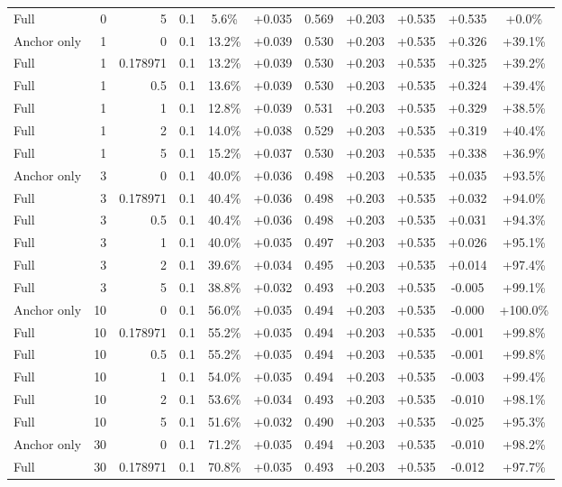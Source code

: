 \begin{table}[htbp]
\begin{tabular}{lrrrccccccc}
Full & 0 & 5 & 0.1 & 5.6\% & +0.035 & 0.569 & +0.203 & +0.535 & +0.535 & +0.0\% \\
Anchor only & 1 & 0 & 0.1 & 13.2\% & +0.039 & 0.530 & +0.203 & +0.535 & +0.326 & +39.1\% \\
Full & 1 & 0.178971 & 0.1 & 13.2\% & +0.039 & 0.530 & +0.203 & +0.535 & +0.325 & +39.2\% \\
Full & 1 & 0.5 & 0.1 & 13.6\% & +0.039 & 0.530 & +0.203 & +0.535 & +0.324 & +39.4\% \\
Full & 1 & 1 & 0.1 & 12.8\% & +0.039 & 0.531 & +0.203 & +0.535 & +0.329 & +38.5\% \\
Full & 1 & 2 & 0.1 & 14.0\% & +0.038 & 0.529 & +0.203 & +0.535 & +0.319 & +40.4\% \\
Full & 1 & 5 & 0.1 & 15.2\% & +0.037 & 0.530 & +0.203 & +0.535 & +0.338 & +36.9\% \\
Anchor only & 3 & 0 & 0.1 & 40.0\% & +0.036 & 0.498 & +0.203 & +0.535 & +0.035 & +93.5\% \\
Full & 3 & 0.178971 & 0.1 & 40.4\% & +0.036 & 0.498 & +0.203 & +0.535 & +0.032 & +94.0\% \\
Full & 3 & 0.5 & 0.1 & 40.4\% & +0.036 & 0.498 & +0.203 & +0.535 & +0.031 & +94.3\% \\
Full & 3 & 1 & 0.1 & 40.0\% & +0.035 & 0.497 & +0.203 & +0.535 & +0.026 & +95.1\% \\
Full & 3 & 2 & 0.1 & 39.6\% & +0.034 & 0.495 & +0.203 & +0.535 & +0.014 & +97.4\% \\
Full & 3 & 5 & 0.1 & 38.8\% & +0.032 & 0.493 & +0.203 & +0.535 & -0.005 & +99.1\% \\
Anchor only & 10 & 0 & 0.1 & 56.0\% & +0.035 & 0.494 & +0.203 & +0.535 & -0.000 & +100.0\% \\
Full & 10 & 0.178971 & 0.1 & 55.2\% & +0.035 & 0.494 & +0.203 & +0.535 & -0.001 & +99.8\% \\
Full & 10 & 0.5 & 0.1 & 55.2\% & +0.035 & 0.494 & +0.203 & +0.535 & -0.001 & +99.8\% \\
Full & 10 & 1 & 0.1 & 54.0\% & +0.035 & 0.494 & +0.203 & +0.535 & -0.003 & +99.4\% \\
Full & 10 & 2 & 0.1 & 53.6\% & +0.034 & 0.493 & +0.203 & +0.535 & -0.010 & +98.1\% \\
Full & 10 & 5 & 0.1 & 51.6\% & +0.032 & 0.490 & +0.203 & +0.535 & -0.025 & +95.3\% \\
Anchor only & 30 & 0 & 0.1 & 71.2\% & +0.035 & 0.494 & +0.203 & +0.535 & -0.010 & +98.2\% \\
Full & 30 & 0.178971 & 0.1 & 70.8\% & +0.035 & 0.493 & +0.203 & +0.535 & -0.012 & +97.7\% \\

\end{tabular}
\end{table}

